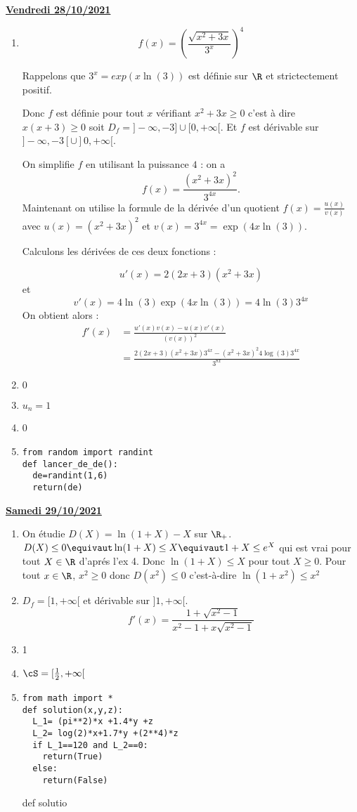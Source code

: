\documentclass[a4paper, 11pt,reqno]{article}
\newcommand{\jour}[1]{
\begin{center}
\underline{\textbf{#1}}
\end{center}

 }
\begin{document}
\jour{Vendredi 28/10/2021}
\begin{correction}
\begin{enumerate}
\item
$$f(x) = \left( \frac{\sqrt{x^2+3x}}{3^x}\right)^4$$

Rappelons que $3^x=exp(x \ln (3)) $ est définie sur $\R$ et strictectement positif. 

Donc $f$ est définie pour tout $x$ vérifiant $x^2+3x \geq 0 $ c'est à dire $x(x+3)\geq 0$ soit $D_f=]-\infty , -3]\cup [0,+\infty[$.
Et $f$ est dérivable sur $]-\infty , -3[\cup ]0,+\infty[$.

On simplifie $f$  en utilisant la puissance $4$ : on a $$f(x) = \frac{(x^2+3x)^2}{3^{4x}}.$$
Maintenant on utilise la formule de la dérivée d'un quotient $f(x) =\frac{u(x)}{v(x)}$ avec 
$u(x) = (x^2+3x)^2$ et $v(x) = 3^{4x} =\exp(4x\ln(3))$. 

Calculons les dérivées de ces deux fonctions : 

$$u'(x) = 2 (2x+3) (x^2+3x)$$ et 
$$v'(x) = 4\ln(3) \exp(4x\ln(3) ) =4\ln(3) 3^{4x} $$
On obtient alors : 
\begin{align*}
f'(x) &= \frac{u'(x)v(x) - u(x)v'(x) }{(v(x))^2}\\
&= \frac{2(2x+3)(x^2+3x)3^{4x}-(x^2+3x)^2 4\log(3) 3^{4x}}{3^{8x}}
\end{align*}


\item $0$
\item $u_n=1$
\item 0
\item 
\begin{lstlisting}
from random import randint
def lancer_de_de():
  de=randint(1,6)
  return(de)
\end{lstlisting}
\end{enumerate}
\end{correction} 
\newpage

\jour{Samedi 29/10/2021}
\begin{correction}
\begin{enumerate}
\item On étudie $D(X) =\ln(1+X) -X$ sur $\R_+$. $D(X)\leq 0 \equivaut \ln(1+X)\leq X \equivaut 1+X\leq e^X$ qui est vrai pour tout $X\in \R$ d'aprés l'ex 4.
Donc $\ln(1+X) \leq X$ pour tout $X\geq 0$. Pour tout $x\in \R$, $x^2 \geq 0$ donc 
$D(x^2) \leq 0$ c'est-à-dire $\ln(1+x^2)\leq x^2$
\item $D_f = [1,+\infty[$ et dérivable sur $]1, +\infty[$. 
$$f'(x) = \frac{1+\sqrt{x^2-1}}{x^2-1+x\sqrt{x^2-1}}$$
\item 1
\item $\cS=[\frac{1}{2}, +\infty[$
\item 
\begin{lstlisting}
from math import *
def solution(x,y,z):
  L_1= (pi**2)*x +1.4*y +z 
  L_2= log(2)*x+1.7*y +(2**4)*z
  if L_1==120 and L_2==0:
    return(True)
  else:
    return(False)
\end{lstlisting}
def solutio
\end{enumerate}
\end{correction} 
\end{document}
